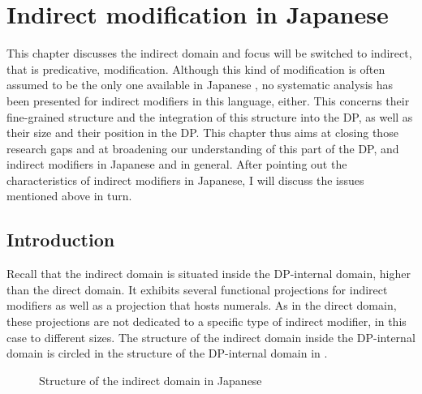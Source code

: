 \chapter{Indirect modification in Japanese} \label{indirect japanese}

This chapter discusses the indirect domain and focus will be switched to indirect, that is predicative, modification. Although this kind of modification is often assumed to be the only one available in Japanese \citep{sproat:1991:the, baker:2003:verbal, laenzlinger:2011:elements}, no systematic analysis has been presented for indirect modifiers in this language, either. This concerns their fine-grained structure and the integration of this structure into the DP, as well as their size and their position in the DP. This chapter thus aims at closing those research gaps and at broadening our understanding of this part of the DP, and indirect modifiers in Japanese and in general. After pointing out the characteristics of indirect modifiers in Japanese, I will discuss the issues mentioned above in turn. %

\section{Introduction}

Recall that the indirect domain is situated inside the DP-internal domain, higher than the direct domain. It exhibits several functional projections for indirect modifiers as well as a projection that hosts numerals. As in the direct domain, these projections are not dedicated to a specific type of indirect modifier, in this case to different sizes. The structure of the indirect domain inside the DP-internal domain is circled in the structure of the DP-internal domain in .

\begin{figure}


 \caption{Structure of the indirect domain in Japanese}
 \label{fig:Structure of the indirect domain in Japanese2}
\end{figure}

